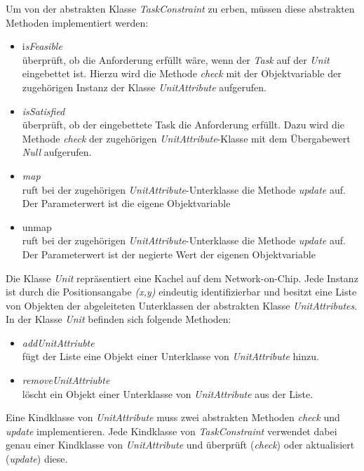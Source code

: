 Um von der abstrakten Klasse \textit{TaskConstraint} zu erben, müssen diese abstrakten Methoden implementiert werden:\\
\begin{itemize}
\item i\textit{sFeasible}\\
überprüft, ob die Anforderung erfüllt wäre, wenn der \textit{Task} auf der \textit{Unit} eingebettet ist. Hierzu wird die Methode \textit{check} mit der Objektvariable der zugehörigen Instanz der Klasse \textit{UnitAttribute} aufgerufen.
\item \textit{isSatisfied}\\
überprüft, ob der eingebettete Task die Anforderung erfüllt. Dazu wird die Methode \textit{check} der zugehörigen \textit{UnitAttribute}-Klasse mit dem Übergabewert \textit{Null} aufgerufen. 
\item \textit{map} \\
ruft bei der zugehörigen \textit{UnitAttribute}-Unterklasse die Methode \textit{update} auf. Der Parameterwert ist die eigene Objektvariable
\item \textit{}unmap\\
ruft bei der zugehörigen \textit{UnitAttribute}-Unterklasse die Methode \textit{update} auf. Der Parameterwert ist der negierte Wert der eigenen Objektvariable
\end{itemize}

Die Klasse \textit{Unit} repräsentiert eine Kachel auf dem Network-on-Chip. Jede Instanz ist durch die Positionsangabe \textit{(x,y)} eindeutig identifizierbar und besitzt eine Liste von Objekten der abgeleiteten Unterklassen der abstrakten Klasse \textit{UnitAttributes}. In der Klasse \textit{Unit} befinden sich folgende Methoden:
\begin{itemize}
\item \textit{addUnitAttriubte}\\
fügt der Liste eine Objekt einer Unterklasse von \textit{UnitAttribute} hinzu.
\item \textit{removeUnitAttriubte}\\
löscht ein Objekt einer Unterklasse von \textit{UnitAttribute} aus der Liste.
\end{itemize}

Eine Kindklasse von \textit{UnitAttribute} muss zwei abstrakten Methoden \textit{check} und \textit{update} implementieren. Jede Kindklasse von \textit{TaskConstraint} verwendet dabei genau einer Kindklasse von \textit{UnitAttribute} und überprüft (\textit{check}) oder aktualisiert (\textit{update}) diese.

